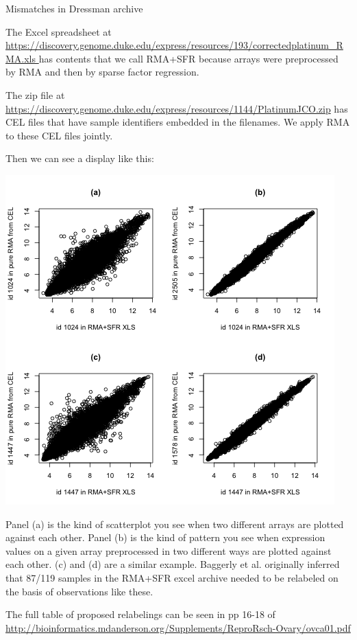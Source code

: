 \documentclass[12pt]{article}
\begin{document}


Mismatches in Dressman archive

The Excel spreadsheet at 
\url{
https://discovery.genome.duke.edu/express/resources/193/correctedplatinum_RMA.xls
}
has contents that we call RMA+SFR because arrays were preprocessed
by RMA and then by sparse factor regression.

The zip file at 
\url{https://discovery.genome.duke.edu/express/resources/1144/PlatinumJCO.zip}
has CEL files that have sample identifiers embedded in the filenames.
We apply RMA to these CEL files jointly.

Then we can see a display like this:

\includegraphics{corChk}


Panel (a) is the kind of scatterplot you see when two different
arrays are plotted against each other.  Panel (b) is the kind
of pattern you see when expression values on a given array
preprocessed in two different ways are plotted against each other.
(c) and (d) are a similar example.  Baggerly et al. originally
inferred that 87/119 samples in the RMA+SFR excel archive
needed to be relabeled on the basis of observations like these.

The full table of proposed relabelings can be seen in
pp 16-18 of
\url{http://bioinformatics.mdanderson.org/Supplements/ReproRsch-Ovary/ovca01.pdf}
\end{document}
